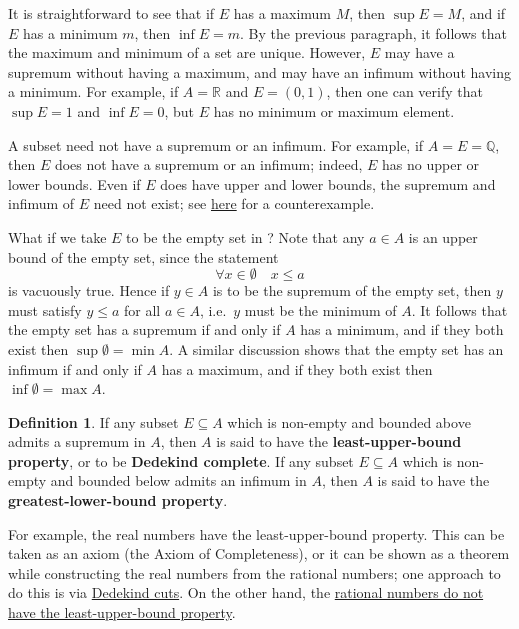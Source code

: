 \documentclass[12pt]{article}
\theoremstyle{definition}
\newtheorem{definition}{Definition}[section]
\begin{document}
It is straightforward to see that if \( E \) has a maximum \( M \), then \( \sup E = M \), and if \( E \) has a minimum \( m \), then \( \inf E = m \). By the previous paragraph, it follows that the maximum and minimum of a set are unique. However, \( E \) may have a supremum without having a maximum, and may have an infimum without having a minimum. For example, if \( A = \mathbb{R} \) and \( E = (0, 1) \), then one can verify that \( \sup E = 1 \) and \( \inf E = 0 \), but \( E \) has no minimum or maximum element.

A subset need not have a supremum or an infimum. For example, if \( A = E = \mathbb{Q} \), then \( E \) does not have a supremum or an infimum; indeed, \( E \) has no upper or lower bounds. Even if \( E \) does have upper and lower bounds, the supremum and infimum of \( E \) need not exist; see \href{https://lew98.github.io/Mathematics/Q_does_not_have_the_least_upper_bound_property.pdf}{here} for a counterexample.

What if we take \( E \) to be the empty set in ? Note that any \( a \in A \) is an upper bound of the empty set, since the statement
\[
    \forall x \in \emptyset \quad x \leq a
\]
is vacuously true. Hence if \( y \in A \) is to be the supremum of the empty set, then \( y \) must satisfy \( y \leq a \) for all \( a \in A \), i.e.\ \( y \) must be the minimum of \( A \). It follows that the empty set has a supremum if and only if \( A \) has a minimum, and if they both exist then \( \sup \emptyset = \min A \). A similar discussion shows that the empty set has an infimum if and only if \( A \) has a maximum, and if they both exist then \( \inf \emptyset = \max A \).

\begin{definition}
\label{def:lub_glb_properties}
    If any subset \( E \subseteq A \) which is non-empty and bounded above admits a supremum in \( A \), then \( A \) is said to have the \textbf{least-upper-bound property}, or to be \textbf{Dedekind complete}. If any subset \( E \subseteq A \) which is non-empty and bounded below admits an infimum in \( A \), then \( A \) is said to have the \textbf{greatest-lower-bound property}.
\end{definition}

For example, the real numbers have the least-upper-bound property. This can be taken as an axiom (the Axiom of Completeness), or it can be shown as a theorem while constructing the real numbers from the rational numbers; one approach to do this is via \href{https://lew98.github.io/Mathematics/Construction_of_R_from_Q_via_Dedekind_cuts.pdf}{Dedekind cuts}. On the other hand, the \href{https://lew98.github.io/Mathematics/Q_does_not_have_the_least_upper_bound_property.pdf}{rational numbers do not have the least-upper-bound property}.
\end{document}
